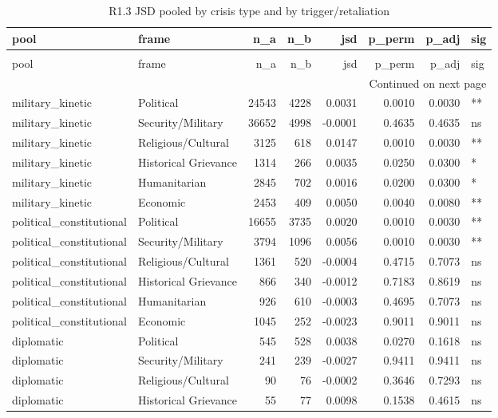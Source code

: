 \begin{longtable}{llrrrrrl}
\caption{R1.3 JSD pooled by crisis type and by trigger/retaliation} \label{tab:r1r2_pooled_jsd} \\
\toprule
pool & frame & n\_a & n\_b & jsd & p\_perm & p\_adj & sig \\
\midrule
\endfirsthead
\caption[]{R1.3 JSD pooled by crisis type and by trigger/retaliation} \\
\toprule
pool & frame & n\_a & n\_b & jsd & p\_perm & p\_adj & sig \\
\midrule
\endhead
\midrule
\multicolumn{8}{r}{Continued on next page} \\
\midrule
\endfoot
\bottomrule
\endlastfoot
military\_kinetic & Political & 24543 & 4228 & 0.0031 & 0.0010 & 0.0030 & ** \\
military\_kinetic & Security/Military & 36652 & 4998 & -0.0001 & 0.4635 & 0.4635 & ns \\
military\_kinetic & Religious/Cultural & 3125 & 618 & 0.0147 & 0.0010 & 0.0030 & ** \\
military\_kinetic & Historical Grievance & 1314 & 266 & 0.0035 & 0.0250 & 0.0300 & * \\
military\_kinetic & Humanitarian & 2845 & 702 & 0.0016 & 0.0200 & 0.0300 & * \\
military\_kinetic & Economic & 2453 & 409 & 0.0050 & 0.0040 & 0.0080 & ** \\
political\_constitutional & Political & 16655 & 3735 & 0.0020 & 0.0010 & 0.0030 & ** \\
political\_constitutional & Security/Military & 3794 & 1096 & 0.0056 & 0.0010 & 0.0030 & ** \\
political\_constitutional & Religious/Cultural & 1361 & 520 & -0.0004 & 0.4715 & 0.7073 & ns \\
political\_constitutional & Historical Grievance & 866 & 340 & -0.0012 & 0.7183 & 0.8619 & ns \\
political\_constitutional & Humanitarian & 926 & 610 & -0.0003 & 0.4695 & 0.7073 & ns \\
political\_constitutional & Economic & 1045 & 252 & -0.0023 & 0.9011 & 0.9011 & ns \\
diplomatic & Political & 545 & 528 & 0.0038 & 0.0270 & 0.1618 & ns \\
diplomatic & Security/Military & 241 & 239 & -0.0027 & 0.9411 & 0.9411 & ns \\
diplomatic & Religious/Cultural & 90 & 76 & -0.0002 & 0.3646 & 0.7293 & ns \\
diplomatic & Historical Grievance & 55 & 77 & 0.0098 & 0.1538 & 0.4615 & ns \\

\end{longtable}
